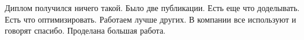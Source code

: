 
\startconclusionpage
Диплом получился ничего такой.
Было две публикации.
Есть еще что доделывать.
Есть что оптимизировать.
Работаем лучше других.
В компании все используют и говорят спасибо.
Проделана большая работа.

\printmainbibliography
